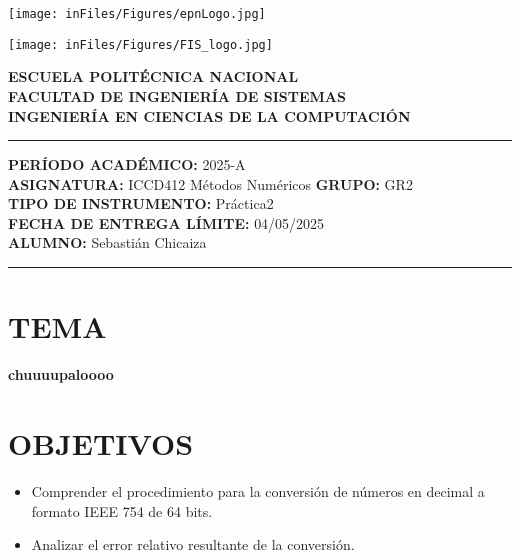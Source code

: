 \documentclass[12pt]{article}
\begin{document}
\begin{minipage}{0.45\textwidth}
    \texttt{[image: inFiles/Figures/epnLogo.jpg]}
\end{minipage}
\hfill
\begin{minipage}{0.45\textwidth}
    \raggedleft
    \texttt{[image: inFiles/Figures/FIS\_logo.jpg]}
\end{minipage}

\vspace{0.5cm}

\begin{center}
    \textbf{ESCUELA POLITÉCNICA NACIONAL}\\[0.2cm]
    \textbf{FACULTAD DE INGENIERÍA DE SISTEMAS}\\[0.2cm]
    \textbf{INGENIERÍA EN CIENCIAS DE LA COMPUTACIÓN}
\end{center}

\vspace{0.5cm}
\hrule
\vspace{0.5cm}

\noindent\textbf{PERÍODO ACADÉMICO:} 2025-A\\[0.2cm]
\noindent\textbf{ASIGNATURA:} ICCD412 Métodos Numéricos \hfill \textbf{GRUPO:} GR2\\[0.2cm]
\noindent\textbf{TIPO DE INSTRUMENTO:} Práctica2\\[0.2cm]
\noindent\textbf{FECHA DE ENTREGA LÍMITE:} {04/05/2025}\\[0.2cm]
\noindent\textbf{ALUMNO:} {Sebastián Chicaiza}

\vspace{0.5cm}
\hrule
\vspace{1cm}


\section*{TEMA}

\begin{center}
    \Large\textbf{chuuuupaloooo}
\end{center}
\vspace{0.5cm}

\section*{OBJETIVOS}
\begin{itemize}
    \item {Comprender el procedimiento para la conversión de números en decimal a formato IEEE 754 de 64 bits.}
    \item { Analizar el error relativo resultante de la conversión.}
\end{itemize}
\vspace{0.5cm}
\end{document}
